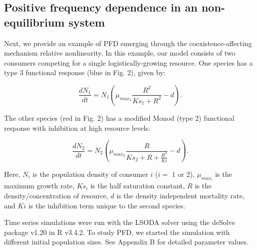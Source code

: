 				
				
\subsection{Positive frequency dependence in an non-equilibrium system}
Next, we provide an example of PFD emerging through the coexistence-affecting mechanism relative nonlinearity. In this example, our model consists of two consumers competing for a single logistically-growing resource. One species has a type 3 functional response (blue in Fig. 2), given by: 
				
\begin{equation}
\frac{dN_{1}}{dt} = N_{1}(\mu _{max_{1}}\frac{R^2}{Ks_{1} + R^2}-d).\tag{3.15}\label{eq:3.15}
\end{equation}
				
The other species (red in Fig. 2) has a modified Monod (type 2) functional response with inhibition at high resource levels: 
				
\begin{equation}
\frac{dN_{2}}{dt} = N_{2}(\mu _{max_{2}}\frac{R}{Ks_{2} + R + \frac{R^2}{Ki}}-d).\tag{3.16}\label{eq:3.16}
\end{equation}
				
Here, $N_{i}$ is the population density of consumer $i$ ($i = $ 1 or 2), $\mu_{max_{i}}$ is the maximum growth rate, $Ks_{i}$ is the half saturation constant, $R$ is the density/concentration of resource, $d$ is the density independent mortality rate, and $Ki$ is the inhibition term unique to the second species. 
\par


Time series simulations were run with the LSODA solver using the deSolve package v1.20 \citep{soetaert2016package} in R v3.4.2. To study PFD, we started the simulation with different initial population sizes. See Appendix B for detailed parameter values. 
\par

				



